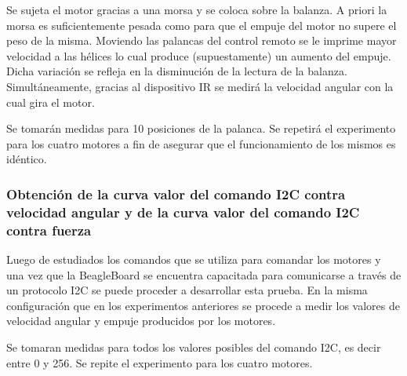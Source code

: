 \documentclass[spanish,12pt,a4paper,titlepage]{report}
\begin{document}
Se sujeta el motor gracias a una morsa y se coloca sobre la balanza. A priori la morsa es suficientemente pesada como para que el empuje del motor no supere el peso de la misma. Moviendo las palancas del control remoto se le imprime mayor velocidad a las hélices lo cual produce (supuestamente) un aumento del empuje. Dicha variación se refleja en la disminución de la lectura de la balanza. 
Simultáneamente, gracias al dispositivo IR se medirá la velocidad angular con la cual gira el motor. 

Se tomarán medidas para 10 posiciones de la palanca.
Se repetirá el experimento para los cuatro motores a fin de asegurar que el funcionamiento de los mismos es idéntico.



\subsubsection*{Obtención de la curva valor del comando I2C contra velocidad angular y de la curva valor del comando I2C contra fuerza}

Luego de estudiados los comandos que se utiliza para comandar los motores y una vez que la BeagleBoard se encuentra capacitada para comunicarse a través de un protocolo I2C se puede proceder a desarrollar esta prueba. En la misma configuración que en los experimentos anteriores se procede a medir los valores de velocidad angular y empuje producidos por los motores. 

Se tomaran medidas para todos los valores posibles del comando I2C, es decir entre 0 y 256.
Se repite el experimento para los cuatro motores.
\end{document}
